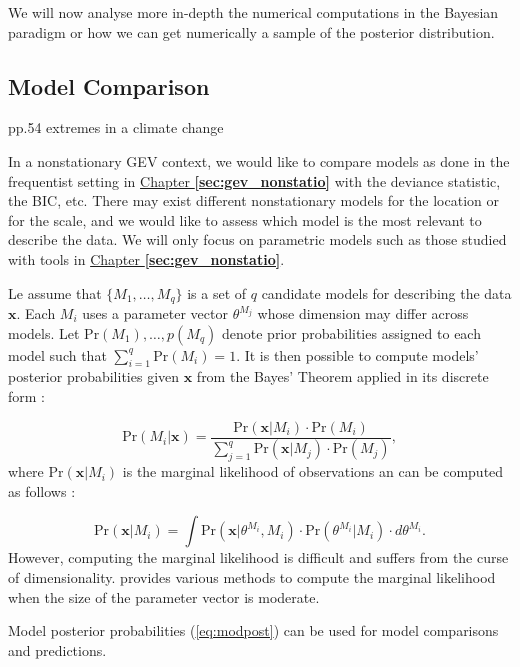 We will now analyse more in-depth the numerical computations in the Bayesian paradigm or how we can get numerically a sample of the posterior distribution.


\subsection{Model Comparison}\label{sec:modcompbay}

pp.54 extremes in a climate change 

In a nonstationary GEV context, we would like to compare models as done in the frequentist setting in \hyperref[sec:gev_nonstatio]{Chapter \textbf{\ref{sec:gev_nonstatio}}} with the deviance statistic, the BIC, etc.
There may exist different nonstationary models for the location or for the scale, and we would like to assess which model is the most relevant to describe the data. We will only focus on parametric models such as those studied with tools in \hyperref[sec:gev_nonstatio]{Chapter \textbf{\ref{sec:gev_nonstatio}}}. 

Le assume that $\big\{M_1,\ldots,M_q\big\}$ is a set of $q$ candidate models for describing the data $\boldsymbol{x}$. Each $M_i$ uses a parameter vector $\theta^{M_j}$ whose dimension may differ across models. Let $\text{Pr}(M_1),\ldots,p(M_q)$ denote prior probabilities assigned to each model such that $\sum_{i=1}^q \text{Pr}(M_i)=1$.
It is then possible to compute models' posterior probabilities given $\boldsymbol{x}$ from the Bayes' Theorem applied in its discrete form : 

\begin{equation}\label{eq:modpost}
\text{Pr}(M_i|\boldsymbol{x})=\frac{\text{Pr}(\boldsymbol{x}|M_i)\cdot \text{Pr}(M_i)}{\sum_{j=1}^q \text{Pr}(\boldsymbol{x}|M_j)\cdot \text{Pr}(M_j)},
\end{equation}
where $\text{Pr}(\boldsymbol{x}|M_i)$ is the marginal likelihood of observations an can be computed as follows : 

\begin{equation*}
\text{Pr}(\boldsymbol{x}|M_i)=\int \text{Pr}(\boldsymbol{x}|\theta^{M_i},M_i)\cdot \text{Pr}(\theta^{M_i}|M_i)\cdot d\theta^{M_i}.
\end{equation*}
However, computing the marginal likelihood is difficult and suffers from the curse of dimensionality. \citet{Bos2002} provides various methods to compute the marginal likelihood when the size of the parameter vector is moderate.

Model posterior probabilities (\ref{eq:modpost}) can be used for model comparisons and predictions.

